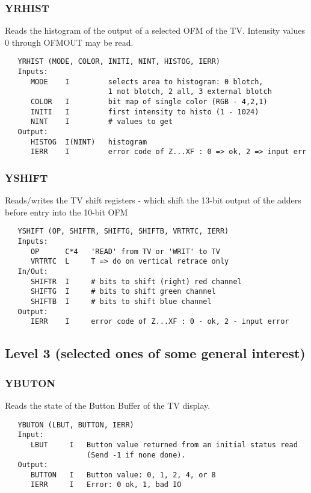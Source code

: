 \subsubsection{YRHIST}
Reads the histogram of the output of a selected OFM of the
TV.   Intensity values 0 through OFMOUT may be read.
\begin{verbatim}
   YRHIST (MODE, COLOR, INITI, NINT, HISTOG, IERR)
   Inputs:
      MODE    I         selects area to histogram: 0 blotch,
                        1 not blotch, 2 all, 3 external blotch
      COLOR   I         bit map of single color (RGB - 4,2,1)
      INITI   I         first intensity to histo (1 - 1024)
      NINT    I         # values to get
   Output:
      HISTOG  I(NINT)   histogram
      IERR    I         error code of Z...XF : 0 => ok, 2 => input err

\end{verbatim}

\subsubsection{YSHIFT}
Reads/writes the TV shift registers - which shift the
13-bit output of the adders before entry into the 10-bit OFM
\begin{verbatim}
   YSHIFT (OP, SHIFTR, SHIFTG, SHIFTB, VRTRTC, IERR)
   Inputs:
      OP      C*4   'READ' from TV or 'WRIT' to TV
      VRTRTC  L     T => do on vertical retrace only
   In/Out:
      SHIFTR  I     # bits to shift (right) red channel
      SHIFTG  I     # bits to shift green channel
      SHIFTB  I     # bits to shift blue channel
   Output:
      IERR    I     error code of Z...XF : 0 - ok, 2 - input error

\end{verbatim}


\subsection{Level 3 (selected ones of some general interest)}

\subsubsection{YBUTON}
Reads the state of the Button Buffer of the TV display.
\begin{verbatim}
   YBUTON (LBUT, BUTTON, IERR)
   Input:
      LBUT     I   Button value returned from an initial status read
                   (Send -1 if none done).
   Output:
      BUTTON   I   Button value: 0, 1, 2, 4, or 8
      IERR     I   Error: 0 ok, 1, bad IO

\end{verbatim}

